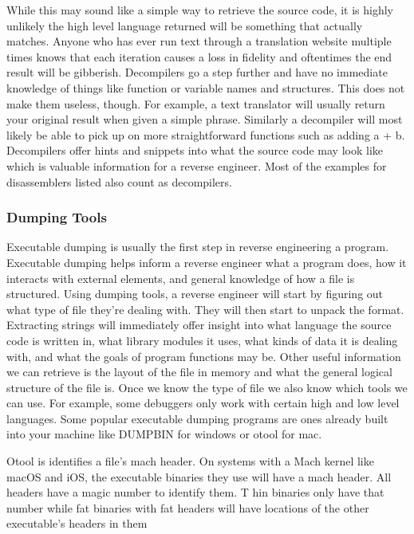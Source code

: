While this may sound like a simple way to retrieve the source code, it is highly unlikely the high level language returned will be something that actually matches. 
Anyone who has ever run text through a translation website multiple times knows that each iteration causes a loss in fidelity and oftentimes the end result will be gibberish. 
Decompilers go a step further and have no immediate knowledge of things like function or variable names and structures. 
This does not make them useless, though. For example, a text translator will usually return your original result when given a simple phrase. 
Similarly a decompiler will most likely be able to pick up on more straightforward functions such as adding a + b. 
Decompilers offer hints and snippets into what the source code may look like which is valuable information for a reverse engineer. 
Most of the examples for disassemblers listed also count as decompilers.

\subsubsection{Dumping Tools}
Executable dumping is usually the first step in reverse engineering a program. 
Executable dumping helps inform a reverse engineer what a program does, how it interacts with external elements, and general knowledge of how a file is structured. 
Using dumping tools, a reverse engineer will start by figuring out what type of file they’re dealing with. 
They will then start to unpack the format. 
Extracting strings will immediately offer insight into what language the source code is written in, what library modules it uses, what kinds of data it is dealing with, and what the goals of program functions may be. 
Other useful information we can retrieve is the layout of the file in memory and what the general logical structure of the file is. Once we know the type of file we also know which tools we can use. 
For example, some debuggers only work with certain high and low level languages. 
Some popular executable dumping programs are ones already built into your machine like DUMPBIN for windows or otool for mac. 

Otool is identifies a file's mach header. 
On systems with a Mach kernel like macOS and iOS, the executable binaries they use will have a mach header. 
All headers have a magic number to identify them. T
hin binaries only have that number while fat binaries with fat headers will have locations of the other executable's headers in them

